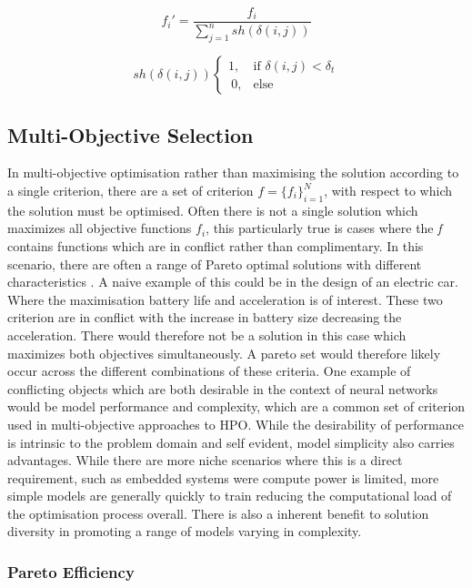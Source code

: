 \documentclass{article}
\begin{document}
		\begin{equation}\label{eq:NEAT2}	f_i' = \frac{f_i}{\sum_{j=1}^nsh(\delta(i,j))}
		\end{equation}

		\begin{equation}\label{eq:NEAT21} sh(\delta(i,j)) \begin{cases}
							1, & \text{if } \delta(i,j) < \delta_t\\\
							0, & \text{else}\end{cases} \end{equation}




	\subsection{Multi-Objective Selection} \label{MOS}
		In multi-objective optimisation rather than maximising the solution according to a single criterion, there are a set of criterion \(f = \{f_i\}_{i=1}^N\), with respect to which the solution must be optimised. Often there is not a single solution which maximizes all objective functions \(f_i\), this particularly true is cases where the \textit{f} contains functions which are in conflict rather than complimentary. In this scenario, there are often a range of Pareto optimal solutions with different characteristics \cite{pareto}. A naive example of this could be in the design of an electric car. Where the maximisation battery life and acceleration is of interest. These two criterion are in conflict with the increase in battery size decreasing the acceleration. There would therefore not be a solution in this case which maximizes both objectives simultaneously. A pareto set would therefore likely occur across the different combinations of these criteria.
		One example of conflicting objects which are both desirable in the context of neural networks would be model performance and complexity, which are a common set of criterion used in multi-objective approaches to HPO. While the desirability of performance is intrinsic to the problem domain and self evident, model simplicity also carries advantages. While there are more niche scenarios where this is a direct requirement, such as embedded systems were compute power is limited, more simple models are generally quickly to train reducing the computational load of the optimisation process overall. There is also a inherent benefit to solution diversity in promoting a range of models varying in complexity.

		\subsubsection{Pareto Efficiency}
\end{document}
